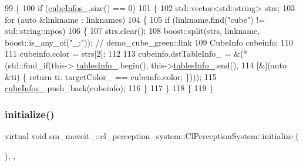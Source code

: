 \begin{DoxyCode}
99             \{
100                 \textcolor{keywordflow}{if} (\hyperlink{classsm__moveit__4_1_1cl__perception__system_1_1ClPerceptionSystem_ac4a5ed3c9acd94895b1986c55210da84}{cubeInfos\_}.size() == 0)
101                 \{
102                     std::vector<std::string> strs;
103                     \textcolor{keywordflow}{for} (\textcolor{keyword}{auto} &linkname : linknames)
104                     \{
105                         \textcolor{keywordflow}{if} (linkname.find(\textcolor{stringliteral}{"cube"}) != std::string::npos)
106                         \{
107                             strs.clear();
108                             boost::split(strs, linkname, boost::is\_any\_of(\textcolor{stringliteral}{"\_:"})); \textcolor{comment}{// demo\_cube\_green::link}
109                             CubeInfo cubeinfo;
110 
111                             cubeinfo.color = strs[2];
112 
113                             cubeinfo.dstTableInfo\_ = &(*(std::find\_if(this->
      \hyperlink{classsm__moveit__4_1_1cl__perception__system_1_1ClPerceptionSystem_a21ceecf8b19768639b21493c2d822ec2}{tablesInfo\_}.begin(), this->\hyperlink{classsm__moveit__4_1_1cl__perception__system_1_1ClPerceptionSystem_a21ceecf8b19768639b21493c2d822ec2}{tablesInfo\_}.end(),
114                                                                       [&](\textcolor{keyword}{auto} &ti) \{ \textcolor{keywordflow}{return} ti.
      targetColor\_ == cubeinfo.color; \})));
115                             \hyperlink{classsm__moveit__4_1_1cl__perception__system_1_1ClPerceptionSystem_ac4a5ed3c9acd94895b1986c55210da84}{cubeInfos\_}.push\_back(cubeinfo);
116                         \}
117                     \}
118                 \}
119             \}
\end{DoxyCode}
\mbox{\label{classsm__moveit__4_1_1cl__perception__system_1_1ClPerceptionSystem_a26ae80fff022baeccb4ca81537cefd53}} 
\subsubsection{\texorpdfstring{initialize()}{initialize()}}
{\footnotesize\ttfamily virtual void sm\+\_\+moveit\+\_\+::cl\+\_\+perception\+\_\+system\+::\+Cl\+Perception\+System\+::initialize (\begin{DoxyParamCaption}{ }\end{DoxyParamCaption})\hspace{0.3cm}{\ttfamily [inline]}, {\ttfamily [override]}, {\ttfamily [virtual]}}



